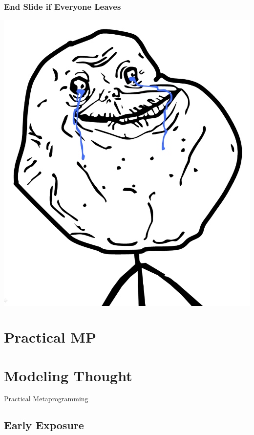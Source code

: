\documentclass[slidestop,compress,mathserif,notes]{beamer}
\begin{document}
\begin{frame}
	\frametitle{End Slide if Everyone Leaves}
	\begin{center}
		\includegraphics[scale=0.25]{img/forever_alone.png}
	\end{center}
\end{frame}


\section{Practical MP} %
\label{sub:practical_metaprogramming}

\section{Modeling Thought} %
\label{sec:modeling_thought}

\begin{frame}
	\begin{center}
		Practical Metaprogramming
	\end{center}
\end{frame}

\subsection{Early Exposure} %
\label{sub:early_exposure}
\end{document}
